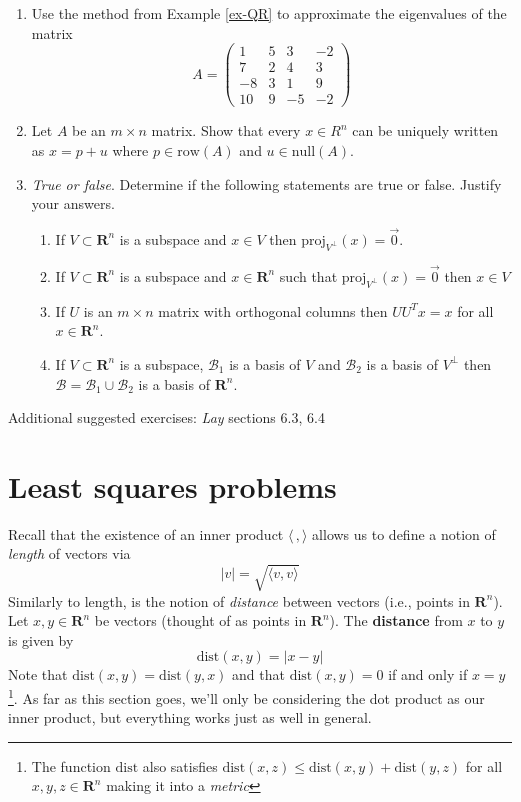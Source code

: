 \documentclass[12pt]{article}
\numberwithin{equation}{subsection}
\numberwithin{figure}{subsection}
\theoremstyle{note}
\newcommand{\R}{\mathbf{R}}
\newcommand\nul[1]{\mathrm{null}(#1)}
\newcommand\row[1]{\mathrm{row}(#1)}
\newcommand\ip[2]{\langle #1, #2\rangle}
\newcommand\proj[2]{\mathrm{proj}_{#1}(#2)}
\begin{document}
\begin{enumerate}[label=\arabic*.]
\item Use the method from Example \ref{ex-QR} to approximate the eigenvalues of the matrix
\[ A=\begin{pmatrix} 1 & 5 & 3 & -2 \\ 7 & 2 & 4 & 3 \\ -8 & 3 & 1 & 9 \\ 10 & 9 & -5 & -2\end{pmatrix}\] 
\item Let $A$ be an $m\times n$ matrix. Show that every $x\in R^n$ can be uniquely written as $x=p+u$ where $p\in \row{A}$ and $u\in \nul{A}$.

\item \textit{True or false}. Determine if the following statements are true or false. Justify your answers.
\begin{enumerate}
	\item If $V\subset \R^n$ is a subspace and $x\in V$ then $\proj{V^{\perp}}{x}=\vec{0}$.
	\item If $V\subset \R^n$ is a subspace and $x\in\R^n$ such that  $\proj{V^{\perp}}{x}=\vec{0}$ then $x\in V$
	\item If $U$ is an $m\times n$ matrix with orthogonal columns then $UU^Tx=x$ for all $x\in \R^n$. 
	\item If $V\subset \R^n$ is a subspace, $\mathcal{B}_1$ is a basis of $V$ and $\mathcal{B}_2$ is a basis of $V^{\perp}$ then $\mathcal{B}=\mathcal{B}_1\cup \mathcal{B}_2$ is a basis of $\R^n$.

\end{enumerate}
\end{enumerate}
Additional suggested exercises: \textit{Lay} sections 6.3, 6.4




\section{Least squares problems}
\label{sec-LS}



Recall that the existence of an inner product $\ip{\,}{}$ allows us to define a notion of \textit{length} of vectors via \begin{equation} |v|=\sqrt{\ip{v}{v}}\end{equation} Similarly to length, is the notion of \textit{distance} between vectors (i.e., points in $\R^n$). Let $x,y\in \R^n$ be vectors (thought of as points in $\R^n$). The \textbf{distance} from $x$ to $y$ is given by \begin{equation} \mathrm{dist}(x,y)=|x-y|\end{equation}
Note that $\mathrm{dist}(x,y)=\mathrm{dist}(y,x)$ and that $\mathrm{dist}(x,y)=0$ if and only if $x=y$\footnote{The function $\mathrm{dist}$ also satisfies $\mathrm{dist}(x,z)\leq \mathrm{dist}(x,y)+\mathrm{dist}(y,z)$ for all $x,y,z\in \R^n$ making it into a \textit{metric}}. As far as this section goes, we'll only be considering the dot product as our inner product, but everything works just as well in general. 
\end{document}
